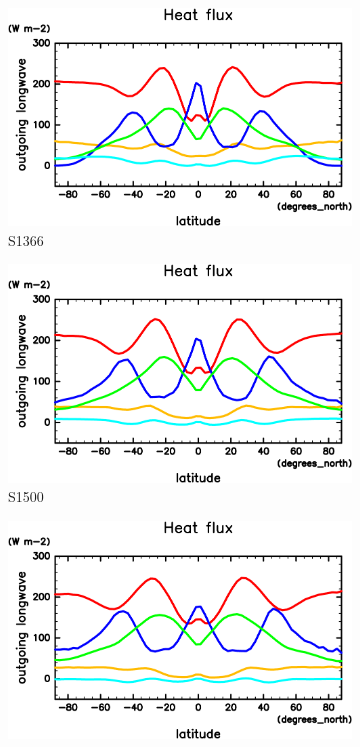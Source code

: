 \documentclass[body]{subfiles}
\begin{document}
\begin{figure}[t]
	\centering
	\begin{subfigure}{.4\textwidth}
		\centering
		\includegraphics[width=\textwidth]{S1366/HeatFlx,time=14600:14965-crop-rotate.pdf}
		\caption{S1366}\label{EnFlx南北分布S1366}
	\end{subfigure}
	\begin{subfigure}{.4\textwidth}
		\centering
		\includegraphics[width=\textwidth]{S1500/HeatFlx,time=3650:4015-crop-rotate.pdf}
		\caption{S1500}\label{EnFlx南北分布S1500}
	\end{subfigure}
	\begin{subfigure}{.4\textwidth}
		\centering
		\includegraphics[width=\textwidth]{S1600/HeatFlx,time=3650:4015-crop-rotate.pdf}

\end{subfigure}
\end{figure}
\end{document}
